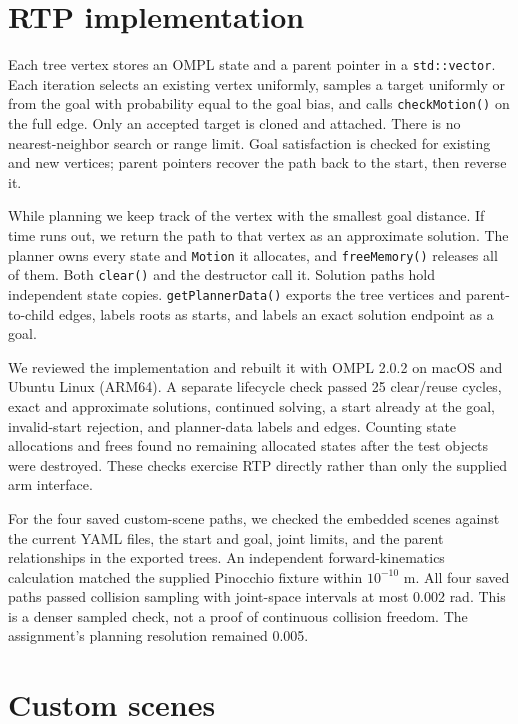 \documentclass{comp450}
\begin{document}
\section*{RTP implementation}

Each tree vertex stores an OMPL state and a parent pointer in a \texttt{std::vector}. Each iteration selects an existing vertex uniformly, samples a target uniformly or from the goal with probability equal to the goal bias, and calls \texttt{checkMotion()} on the full edge. Only an accepted target is cloned and attached. There is no nearest-neighbor search or range limit. Goal satisfaction is checked for existing and new vertices; parent pointers recover the path back to the start, then reverse it.


While planning we keep track of the vertex with the smallest goal distance. If time runs out, we return the path to that vertex as an approximate solution. The planner owns every state and \texttt{Motion} it allocates, and \texttt{freeMemory()} releases all of them. Both \texttt{clear()} and the destructor call it. Solution paths hold independent state copies. \texttt{getPlannerData()} exports the tree vertices and parent-to-child edges, labels roots as starts, and labels an exact solution endpoint as a goal.

We reviewed the implementation and rebuilt it with OMPL 2.0.2 on macOS and Ubuntu Linux (ARM64). A separate lifecycle check passed 25 clear/reuse cycles, exact and approximate solutions, continued solving, a start already at the goal, invalid-start rejection, and planner-data labels and edges. Counting state allocations and frees found no remaining allocated states after the test objects were destroyed. These checks exercise RTP directly rather than only the supplied arm interface.

For the four saved custom-scene paths, we checked the embedded scenes against the current YAML files, the start and goal, joint limits, and the parent relationships in the exported trees. An independent forward-kinematics calculation matched the supplied Pinocchio fixture within $10^{-10}$ m. All four saved paths passed collision sampling with joint-space intervals at most 0.002 rad. This is a denser sampled check, not a proof of continuous collision freedom. The assignment's planning resolution remained 0.005.

\section*{Custom scenes}
\end{document}
